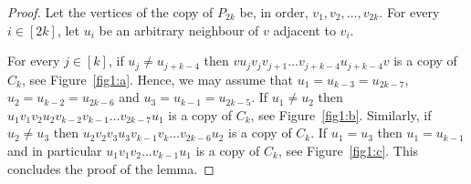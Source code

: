 \documentclass{article}
\begin{document}
\begin{proof}
    Let the vertices of the copy of $P_{2k}$ be, in order, $v_1, v_2, \ldots, v_{2k}$.
    For every $i\in[2k]$, let $u_i$ be an arbitrary neighbour of $v$ adjacent to $v_i$.

    For every $j\in[k]$,  if $u_j\neq u_{j+k-4}$ then $vu_jv_jv_{j+1} \ldots v_{j+k-4}u_{j+k-4}v$ is a copy of $C_k$, see Figure~\ref{fig1:a}.
    Hence, we may assume that $u_1=u_{k-3}=u_{2k-7}$, $u_2=u_{k-2}=u_{2k-6}$ and $u_3=u_{k-1}=u_{2k-5}$.
    If $u_1\neq u_2$ then $u_1v_1v_2u_2v_{k-2}v_{k-1} \ldots v_{2k-7}u_1$ is a copy of $C_k$, see Figure~\ref{fig1:b}.
    Similarly, if $u_2\neq u_3$ then $u_2v_2v_3u_3v_{k-1}v_{k} \ldots v_{2k-6}u_2$ is a copy of $C_k$.
    If $u_1=u_3$ then $u_1=u_{k-1}$ and in particular $u_1v_1v_{2} \ldots v_{k-1}u_1$ is a copy of $C_k$, see Figure~\ref{fig1:c}.
    This concludes the proof of the lemma.
\end{proof}
\end{document}
